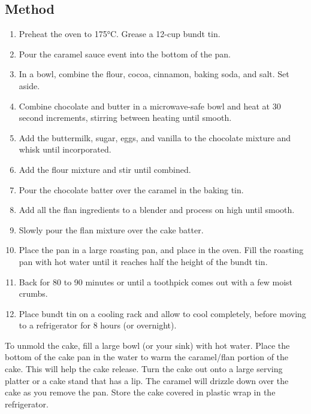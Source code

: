 \begin{multicols}{2}
  \subsection{Method}
    \begin{enumerate}
      \item Preheat the oven to \ang{175}C. Grease a 12-cup bundt tin.
      \item Pour the caramel sauce event into the bottom of the pan.
      \item In a bowl, combine the flour, cocoa, cinnamon, baking soda, and salt. Set aside.
      \item Combine chocolate and butter in a microwave-safe bowl and heat at 30 second increments, stirring between heating until smooth.
      \item Add the buttermilk, sugar, eggs, and vanilla to the chocolate mixture and whisk until incorporated.
      \item Add the flour mixture and stir until combined.
      \item Pour the chocolate batter over the caramel in the baking tin.
      \item Add all the flan ingredients to a blender and process on high until smooth.
      \item Slowly pour the flan mixture over the cake batter.
      \item Place the pan in a large roasting pan, and place in the oven. Fill the roasting pan with hot water until it reaches half the height of the bundt tin.
      \item Back for 80 to 90 minutes or until a toothpick comes out with a few moist crumbs.
      \item Place bundt tin on a cooling rack and allow to cool completely, before moving to a refrigerator for 8 hours (or overnight).
    \end{enumerate}
    To unmold the cake, fill a large bowl (or your sink) with hot water. Place the bottom of the cake pan in the water to warm the caramel/flan portion of the cake. This will help the cake release. Turn the cake out onto a large serving platter or a cake stand that has a lip. The caramel will drizzle down over the cake as you remove the pan. Store the cake covered in plastic wrap in the refrigerator.
  \end{multicols}
